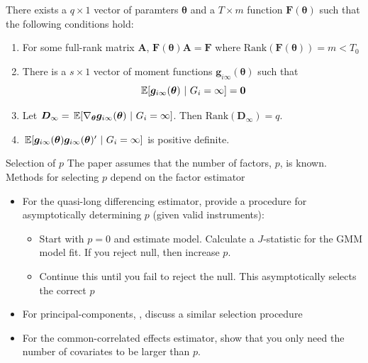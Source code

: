 \documentclass[aspectratio=169,t,11pt]{beamer}
\begin{document}
\begin{frame}\label{slide:appendix-general_factor}
  \begin{block}{}

    There exists a $q \times 1$ vector of paramters $\bm{\theta}$ and a $T \times m$ function $\bm{F}(\bm{\theta})$ such that the following conditions hold:
    \begin{enumerate}
      \item[(i)] For some full-rank matrix $\bm{A}$, $\bm{F}(\bm{\theta}) \bm{A} = \bm{F}$ where $\text{Rank}(\bm{F}(\bm{\theta})) = m < T_0$ 
      \item[(ii)] There is a $s \times 1$ vector of moment functions $\bm g_{i\infty}(\bm{\theta})$ such that 
      \begin{equation*}\label{eq:factor_moments}
        \expec{\bm g_{i\infty}(\bm{\theta})}{G_i = \infty} = \bm 0
      \end{equation*}
      
      \item[(iii)] Let $\bm D_{\infty} = \expec{\nabla_{\bm{\theta}} \bm g_{i \infty}(\bm{\theta})}{G_i = \infty}$. Then $\text{Rank}(\bm D_{\infty}) = q$.
      \item[(iv)] $\expec{\bm g_{i \infty}(\bm{\theta}) \bm g_{i \infty}(\bm{\theta})'}{G_i = \infty}$ is positive definite. 
    \end{enumerate}
  \end{block}
\end{frame}

\begin{frame}{Selection of $p$}\label{slide:appendix-selecting_p}
  The paper assumes that the number of factors, $p$, is known. Methods for selecting $p$ depend on the factor estimator
  
  \begin{itemize}
    \item For the quasi-long differencing estimator, \citet{Ahn_Lee_Schmidt_2013} provide a procedure for asymptotically determining $p$ (given valid instruments):
    \begin{itemize}
      \item Start with $p = 0$ and estimate model. Calculate a $J$-statistic for the GMM model fit. If you reject null, then increase $p$.
      \item Continue this until you fail to reject the null. This asymptotically selects the correct $p$
    \end{itemize}
  
    \smallskip
    \item For principal-components, \citet{xu2017generalized}, discuss a similar selection procedure
 
    \smallskip
    \item For the common-correlated effects estimator, \citet{Brown_Butts_Westerlund_2023} show that you only need the number of covariates to be larger than $p$.
  \end{itemize}

\end{frame}
\end{document}
